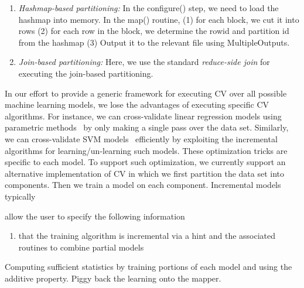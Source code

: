 \documentclass{vldb}
\newcommand{\topicnoul}[1]{\par \smallskip \smallskip \noindent{\bf {#1}}}
\begin{document}
\begin{enumerate}
\item {\em Hashmap-based partitioning:} 
In the configure() step, we need to load the hashmap into memory. In the map()
routine, (1) for each block, we cut it into rows (2) for each row in the block,
we determine the rowid and partition id from the hashmap (3) Output it to the
relevant file using MultipleOutputs.
\item {\em Join-based partitioning:}
Here, we use the standard {\em reduce-side join} for executing the join-based
partitioning.
\end{enumerate}

\topicnoul{CV for Linear/Incremental models:}
In our effort to provide a generic framework for executing CV over all
possible machine learning models, we lose the advantages of executing specific
CV algorithms. For instance, we can cross-validate linear regression
models using parametric methods~\cite{survey} by only making a single pass over the
data set. Similarly, we can cross-validate SVM
models~\cite{DBLP:conf/nips/CauwenberghsP00} efficiently by exploiting the
incremental algorithms for learning/un-learning such models. These optimization
tricks are specific to each model. To support such optimization, we currently
support an alternative implementation of CV in which we first partition the data
set into components. Then we train a model on each component. Incremental models
typically 


allow the user to specify the following information

\begin{enumerate}
\item that the training algorithm is incremental via a hint
and the associated routines to combine partial models 
\end{enumerate}



Computing sufficient statistics by
training portions of each model and using the additive property.
Piggy back the learning onto the mapper.
\end{document}

